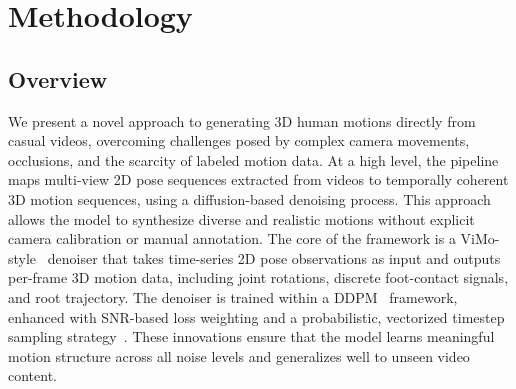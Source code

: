 \section{Methodology}
\label{sec:method}

\subsection{Overview}
\label{sec:overview}

We present a novel approach to generating 3D human motions directly from casual videos, overcoming challenges posed by complex camera movements, occlusions, and the scarcity of labeled motion data. At a high level, the pipeline maps multi-view 2D pose sequences extracted from videos to temporally coherent 3D motion sequences, using a diffusion-based denoising process. This approach allows the model to synthesize diverse and realistic motions without explicit camera calibration or manual annotation. The core of the framework is a ViMo-style~\cite{vimo2024} denoiser that takes time-series 2D pose observations as input and outputs per-frame 3D motion data, including joint rotations, discrete foot-contact signals, and root trajectory. The denoiser is trained within a DDPM~\cite{ddpm2020} framework, enhanced with SNR-based loss weighting and a probabilistic, vectorized timestep sampling strategy~\cite{ptss2024}. These innovations ensure that the model learns meaningful motion structure across all noise levels and generalizes well to unseen video content.

